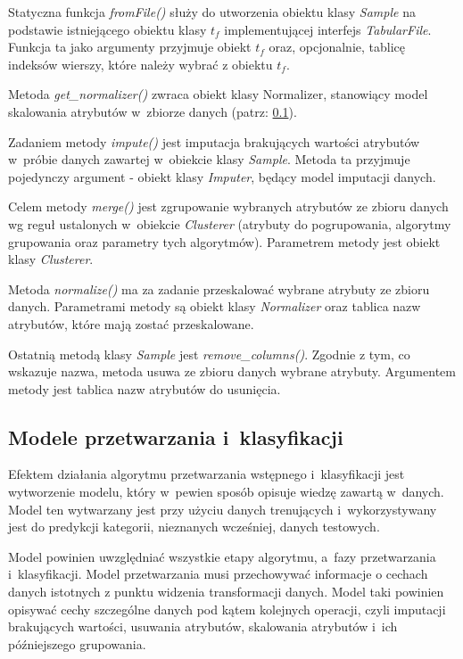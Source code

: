 \documentclass[../thesis.tex]{subfiles}
\begin{document}
Statyczna funkcja \emph{fromFile()} służy do utworzenia obiektu klasy \emph{Sample} na podstawie istniejącego obiektu klasy $t_f$ implementującej interfejs \emph{TabularFile}. Funkcja ta jako argumenty przyjmuje obiekt $t_f$ oraz, opcjonalnie, tablicę indeksów wierszy, które należy wybrać z obiektu $t_f$.

Metoda \emph{get\_normalizer()} zwraca obiekt klasy Normalizer, stanowiący model skalowania atrybutów w~zbiorze danych (patrz: \ref{proj:models}). 

Zadaniem metody \emph{impute()} jest imputacja brakujących wartości atrybutów w~próbie danych zawartej w~obiekcie klasy \emph{Sample}. Metoda ta przyjmuje pojedynczy argument - obiekt klasy \emph{Imputer}, będący model imputacji danych.

Celem metody \emph{merge()} jest zgrupowanie wybranych atrybutów ze zbioru danych wg reguł ustalonych w~obiekcie \emph{Clusterer} (atrybuty do pogrupowania, algorytmy grupowania oraz parametry tych algorytmów). Parametrem metody jest obiekt klasy \emph{Clusterer}.

Metoda \emph{normalize()} ma za zadanie przeskalować wybrane atrybuty ze zbioru danych. Parametrami metody są obiekt klasy \emph{Normalizer} oraz tablica nazw atrybutów, które mają zostać przeskalowane.

Ostatnią metodą klasy \emph{Sample} jest \emph{remove\_columns()}. Zgodnie z tym, co wskazuje nazwa, metoda usuwa ze zbioru danych wybrane atrybuty. Argumentem metody jest tablica nazw atrybutów do usunięcia.

\subsection{Modele przetwarzania i~klasyfikacji}
\label{proj:models}

Efektem działania algorytmu przetwarzania wstępnego i~klasyfikacji jest wytworzenie modelu, który w~pewien sposób opisuje wiedzę zawartą w~danych. Model ten wytwarzany jest przy użyciu danych trenujących i~wykorzystywany jest do predykcji kategorii, nieznanych wcześniej, danych testowych. 

Model powinien uwzględniać wszystkie etapy algorytmu, a~fazy przetwarzania i~klasyfikacji. Model przetwarzania musi przechowywać informacje o cechach danych istotnych z punktu widzenia transformacji danych. Model taki powinien opisywać cechy szczególne danych pod kątem kolejnych operacji, czyli imputacji brakujących wartości, usuwania atrybutów, skalowania atrybutów i~ich późniejszego grupowania.
\end{document}
